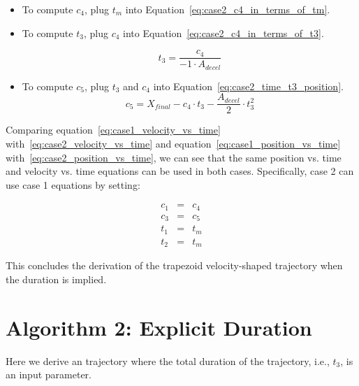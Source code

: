 \documentclass[11pt]{article} %
\begin{document}
\begin{itemize}
\item To compute $c_4$, plug $t_m$ into Equation~\ref{eq:case2_c4_in_terms_of_tm}.
\item To compute $t_3$, plug $c_4$ into Equation~\ref{eq:case2_c4_in_terms_of_t3}.

\begin{equation}
t_3 = \frac{c_4}{-1 \cdot A_{decel}}
\end{equation}

\item To compute $c_5$, plug $t_3$ and $c_4$ into Equation~\ref{eq:case2_time_t3_position}.
\begin{equation}
c_5 = X_{final} - c_4 \cdot t_3 - \frac{A_{decel}}{2} \cdot t_3^2
\end{equation}

\end{itemize}

\noindent Comparing equation~\ref{eq:case1_velocity_vs_time} with~\ref{eq:case2_velocity_vs_time} and equation~\ref{eq:case1_position_vs_time} with~\ref{eq:case2_position_vs_time}, we can see that the same position vs. time and velocity vs. time equations can be used in both cases. Specifically, case 2 can use case 1 equations by setting:

\begin{eqnarray}
c_1 & = & c_4\\
c_3 & = & c_5\\
t_1  & = & t_m\\
t_2 & = & t_m
\end{eqnarray}

\noindent This concludes the derivation of the trapezoid velocity-shaped trajectory when the duration is implied.

\section{Algorithm 2: Explicit Duration}
Here we derive an trajectory where the total duration of the trajectory, i.e., $t_3$, is an input parameter.
\end{document}
